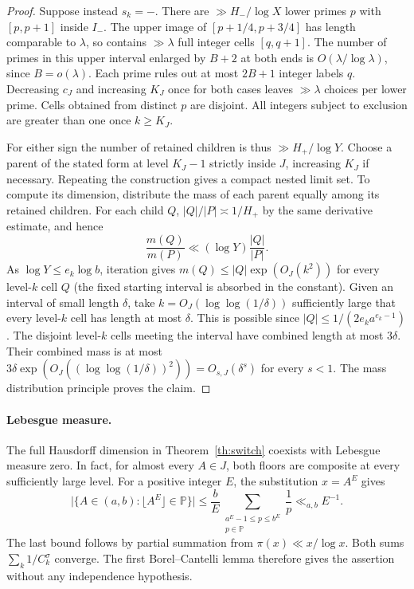 \documentclass[11pt]{article}
\theoremstyle{remark}\newtheorem*{remark}{Remark}
\newcommand{\PP}{\mathbb P}
\begin{document}
\begin{proof}
Suppose instead $s_k=-$. There are $\gg H_-/\log X$ lower primes
$p$ with $[p,p+1]$ inside $I_-$. The upper image of
$[p+1/4,p+3/4]$ has length comparable to $\lambda$, so contains
$\gg\lambda$ full integer cells $[q,q+1]$. The number of primes in
this upper interval enlarged by $B+2$ at both ends is
$O(\lambda/\log\lambda)$, since $B=o(\lambda)$. Each prime rules out
at most $2B+1$ integer labels $q$. Decreasing $c_J$ and increasing
$K_J$ once for both cases leaves $\gg\lambda$ choices per lower
prime. Cells obtained from distinct $p$ are disjoint. All integers
subject to exclusion are greater than one once $k\ge K_J$.

For either sign the number of retained children is thus
$\gg H_+/\log Y$. Choose a parent of the stated form at level
$K_J-1$ strictly inside $J$, increasing $K_J$ if necessary. Repeating
the construction gives a compact nested limit set. To compute its
dimension, distribute the mass of each parent equally among its
retained children. For each child $Q$,
$|Q|/|P|\asymp1/H_+$ by the same derivative estimate, and hence
\[
 \frac{m(Q)}{m(P)}\ll(\log Y)\frac{|Q|}{|P|}.
\]
As $\log Y\le e_k\log b$, iteration gives
$m(Q)\le |Q|\exp(O_J(k^2))$ for every level-$k$ cell $Q$ (the
fixed starting interval is absorbed in the constant).
Given an interval of small length $\delta$, take
$k=O_J(\log\log(1/\delta))$ sufficiently large that every
level-$k$ cell has length at most $\delta$. This is possible
since $|Q|\le 1/(2e_k a^{e_k-1})$. The disjoint level-$k$
cells meeting the interval have combined length at most $3\delta$.
Their combined mass is at most
$3\delta\exp(O_J((\log\log(1/\delta))^2))=O_{s,J}(\delta^s)$
for every $s<1$. The mass distribution principle proves the claim.
\end{proof}

\paragraph{Lebesgue measure.}
The full Hausdorff dimension in Theorem~\ref{th:switch} coexists with
Lebesgue measure zero. In fact, for almost every $A\in J$, both floors
are composite at every sufficiently large level. For a positive integer
$E$, the substitution $x=A^E$ gives
\[
 \big|\{A\in(a,b):\lfloor A^E\rfloor\in\PP\}\big|
 \le \frac{b}{E}\!
       \sum_{\substack{a^E-1\le p\le b^E\\p\in\PP}}\frac1p
 \ll_{a,b} E^{-1} .
\]
The last bound follows by partial summation from $\pi(x)\ll x/\log x$.
Both sums $\sum_k 1/C_k^\sigma$ converge. The first Borel--Cantelli
lemma therefore gives the assertion without any independence hypothesis.
\end{document}
